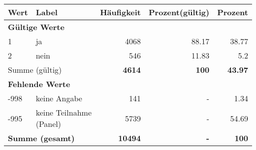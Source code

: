      \begin{longtable}{lXrrr}
     \toprule
     \textbf{Wert} & \textbf{Label} & \textbf{Häufigkeit} & \textbf{Prozent(gültig)} & \textbf{Prozent} \\
     \endhead
     \midrule
     \multicolumn{5}{l}{\textbf{Gültige Werte}}\\

     1 &
     \multicolumn{1}{X}{ ja   } &


       \num{4068} &
       \num[round-mode=places,round-precision=2]{88.17} &
         \num[round-mode=places,round-precision=2]{38.77} \\

     2 &
     \multicolumn{1}{X}{ nein   } &


       \num{546} &
       \num[round-mode=places,round-precision=2]{11.83} &
         \num[round-mode=places,round-precision=2]{5.2} \\
     \midrule
     \multicolumn{2}{l}{Summe (gültig)} &
       \textbf{\num{4614}} &
     \textbf{\num{100}} &
       \textbf{\num[round-mode=places,round-precision=2]{43.97}} \\
     \multicolumn{5}{l}{\textbf{Fehlende Werte}}\\
       -998 &
       keine Angabe &
         \num{141} &
        - &
         \num[round-mode=places,round-precision=2]{1.34} \\
       -995 &
       keine Teilnahme (Panel) &
         \num{5739} &
        - &
         \num[round-mode=places,round-precision=2]{54.69} \\
     \midrule
     \multicolumn{2}{l}{\textbf{Summe (gesamt)}} &
          \textbf{\num{10494}} &
        \textbf{-} &
        \textbf{\num{100}} \\
     \bottomrule
     \end{longtable}
     
